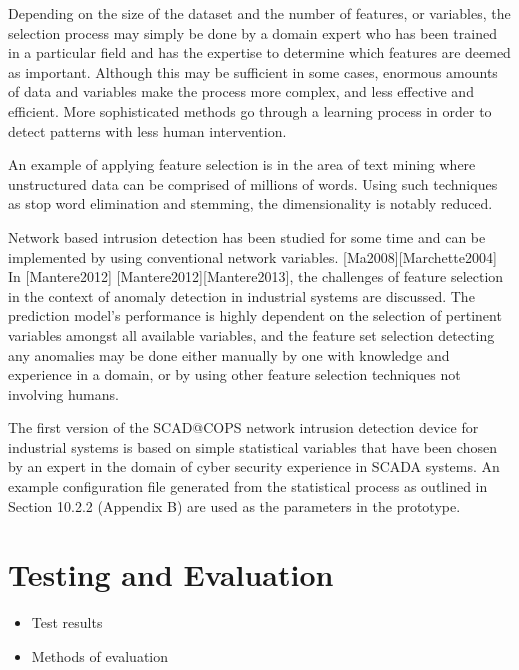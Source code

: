 \documentclass[12pt,]{article}
\begin{document}
Depending on the size of the dataset and the number of features, or
variables, the selection process may simply be done by a domain expert
who has been trained in a particular field and has the expertise to
determine which features are deemed as important. Although this may be
sufficient in some cases, enormous amounts of data and variables make
the process more complex, and less effective and efficient. More
sophisticated methods go through a learning process in order to detect
patterns with less human intervention.

An example of applying feature selection is in the area of text mining
where unstructured data can be comprised of millions of words. Using
such techniques as stop word elimination and stemming, the
dimensionality is notably reduced.

Network based intrusion detection has been studied for some time and can
be implemented by using conventional network variables.
{[}Ma2008{]}{[}Marchette2004{]} In {[}Mantere2012{]}
{[}Mantere2012{]}{[}Mantere2013{]}, the challenges of feature selection
in the context of anomaly detection in industrial systems are discussed.
The prediction model's performance is highly dependent on the selection
of pertinent variables amongst all available variables, and the feature
set selection detecting any anomalies may be done either manually by one
with knowledge and experience in a domain, or by using other feature
selection techniques not involving humans.

The first version of the SCAD@COPS network intrusion detection device
for industrial systems is based on simple statistical variables that
have been chosen by an expert in the domain of cyber security experience
in SCADA systems. An example configuration file generated from the
statistical process as outlined in Section 10.2.2 (Appendix B) are used
as the parameters in the prototype.

\pagebreak

\section{Testing and Evaluation}\label{testing-and-evaluation}

\begin{itemize}
\itemsep1pt\parskip0pt
\item
  Test results\\
\item
  Methods of evaluation
\end{itemize}
\end{document}
